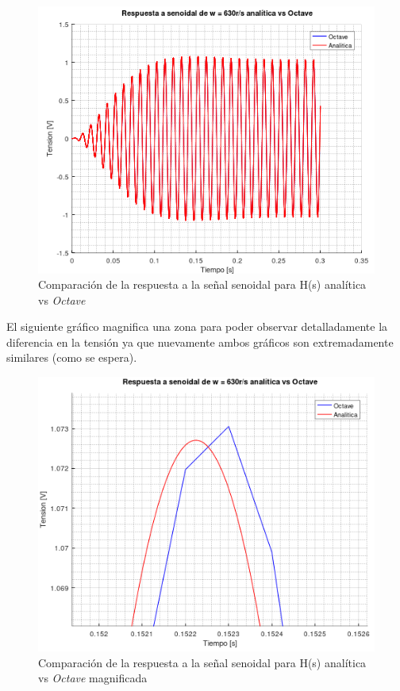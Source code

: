 \documentclass[11pt,a4paper]{report}
\begin{document}
\begin{figure}[h!]
\centering
\includegraphics[scale=0.95]{rtaSenoidalAnaliticavsOctave.png}
\caption{Comparación de la respuesta a la señal senoidal para H(s) analítica vs \textit{Octave}}
\end{figure}
\clearpage

El siguiente gráfico magnifica una zona para poder observar detalladamente la diferencia en la tensión ya que nuevamente ambos gráficos son extremadamente similares (como se espera).

\begin{figure}[ht!]
\centering
\includegraphics[scale=1]{rtaSenoidalAnaliticavsOctaveMagnificada.png}
\caption{Comparación de la respuesta a la señal senoidal para H(s) analítica vs \textit{Octave} magnificada}
\end{figure}
\end{document}
